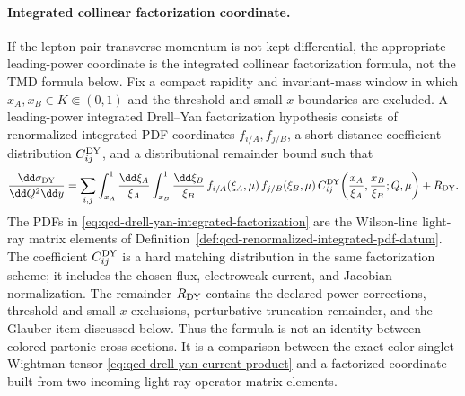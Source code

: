 \paragraph{Integrated collinear factorization coordinate.}
If the lepton-pair transverse momentum is not kept differential, the appropriate
leading-power coordinate is the integrated collinear factorization formula, not
the TMD formula below.  Fix a compact rapidity and invariant-mass window in
which \(x_A,x_B\in K\Subset(0,1)\) and the threshold and small-\(x\) boundaries
are excluded.  A leading-power integrated Drell--Yan factorization hypothesis
consists of renormalized integrated PDF coordinates
\(f_{i/A},f_{j/B}\), a short-distance coefficient distribution
\(C^{\rm DY}_{ij}\), and a distributional remainder bound such that
\begin{equation}
  \frac{\dd\sigma_{\rm DY}}{\dd Q^2\dd y}
  =
  \sum_{i,j}
  \int_{x_A}^{1}\frac{\dd \xi_A}{\xi_A}
  \int_{x_B}^{1}\frac{\dd \xi_B}{\xi_B}\,
  f_{i/A}(\xi_A,\mu)\,
  f_{j/B}(\xi_B,\mu)\,
  C^{\rm DY}_{ij}
  \!\left(\frac{x_A}{\xi_A},\frac{x_B}{\xi_B};
  Q,\mu\right)
  +
  R_{\rm DY}.
  \label{eq:qcd-drell-yan-integrated-factorization}
\end{equation}
The PDFs in \eqref{eq:qcd-drell-yan-integrated-factorization} are the
Wilson-line light-ray matrix elements of
Definition~\ref{def:qcd-renormalized-integrated-pdf-datum}.  The
coefficient \(C^{\rm DY}_{ij}\) is a hard matching distribution in the same
factorization scheme; it includes the chosen flux, electroweak-current, and
Jacobian normalization.  The remainder \(R_{\rm DY}\) contains the declared
power corrections, threshold and small-\(x\) exclusions, perturbative truncation
remainder, and the Glauber item discussed below.  Thus the formula is not an
identity between colored partonic cross sections.  It is a comparison between
the exact color-singlet Wightman tensor
\eqref{eq:qcd-drell-yan-current-product} and a factorized coordinate built from
two incoming light-ray operator matrix elements.

